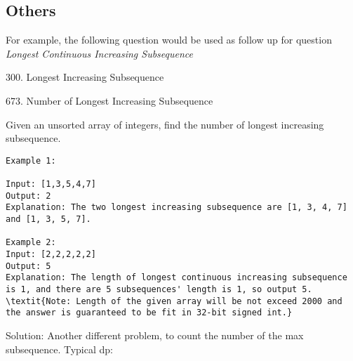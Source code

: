 \documentclass[../main.tex]{subfiles}
\begin{document}

\subsection{Others}
For example, the following question would be used as follow up for question \textit{Longest Continuous Increasing Subsequence}

300. Longest Increasing Subsequence


673. Number of Longest Increasing Subsequence

Given an unsorted array of integers, find the number of longest increasing subsequence.
\begin{lstlisting}
Example 1:

Input: [1,3,5,4,7]
Output: 2
Explanation: The two longest increasing subsequence are [1, 3, 4, 7] and [1, 3, 5, 7].

Example 2:
Input: [2,2,2,2,2]
Output: 5
Explanation: The length of longest continuous increasing subsequence is 1, and there are 5 subsequences' length is 1, so output 5.
\textit{Note: Length of the given array will be not exceed 2000 and the answer is guaranteed to be fit in 32-bit signed int.}
\end{lstlisting}

Solution: Another different problem, to count the number of the max subsequence. Typical dp:
\end{document}

